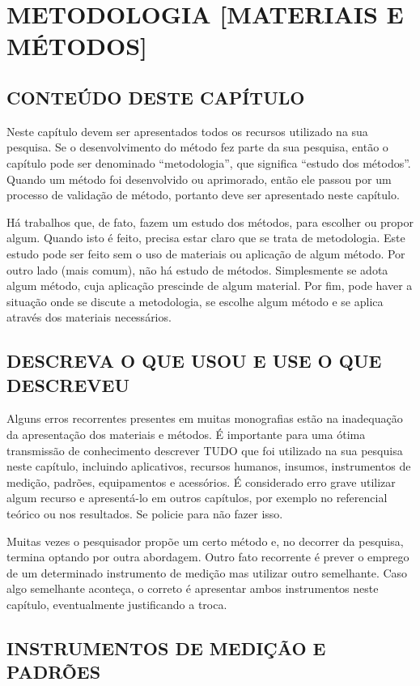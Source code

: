 \chapter{METODOLOGIA [MATERIAIS E MÉTODOS]}
\thispagestyle{empty}	
\section{CONTEÚDO DESTE CAPÍTULO}
Neste capítulo devem ser apresentados todos os recursos utilizado na sua pesquisa. Se o desenvolvimento do método fez parte da sua pesquisa, então o capítulo pode ser denominado “metodologia”, que significa “estudo dos métodos”. Quando um método foi desenvolvido ou aprimorado, então ele passou por um processo de validação de método, portanto deve ser apresentado neste capítulo.

Há trabalhos que, de fato, fazem um estudo dos métodos, para escolher ou propor algum. Quando isto é feito, precisa estar claro que se trata de metodologia. Este estudo pode ser feito sem o uso de materiais ou aplicação de algum método. Por outro lado (mais comum), não há estudo de métodos. Simplesmente se adota algum método, cuja aplicação prescinde de algum material. Por fim, pode haver a situação onde se discute a metodologia, se escolhe algum método e se aplica através dos materiais necessários.

\section{DESCREVA O QUE USOU E USE O QUE DESCREVEU}
Alguns erros recorrentes presentes em muitas monografias estão na inadequação da apresentação dos materiais e métodos. É importante para uma ótima transmissão de conhecimento descrever TUDO que foi utilizado na sua pesquisa neste capítulo, incluindo aplicativos, recursos humanos, insumos, instrumentos de medição, padrões, equipamentos e acessórios. É considerado erro grave utilizar algum recurso e apresentá-lo em outros capítulos, por exemplo no referencial teórico ou nos resultados. Se policie para não fazer isso.

Muitas vezes o pesquisador propõe um certo método e, no decorrer da pesquisa, termina optando por outra abordagem. Outro fato recorrente é prever o emprego de um determinado instrumento de medição mas utilizar outro semelhante. Caso algo semelhante aconteça, o correto é apresentar ambos instrumentos neste capítulo, eventualmente justificando a troca.

\section{INSTRUMENTOS DE MEDIÇÃO E PADRÕES}

